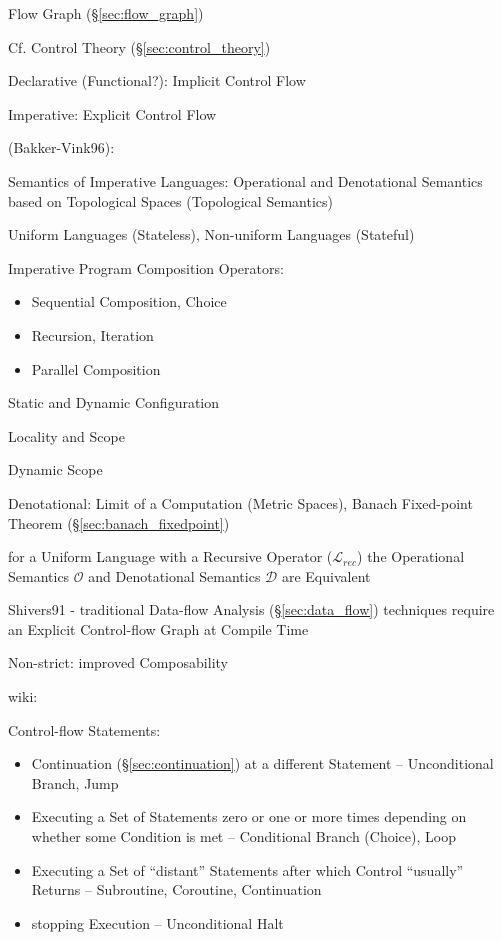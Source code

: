 \fist Flow Graph (\S\ref{sec:flow_graph})

\fist Cf. Control Theory (\S\ref{sec:control_theory})

Declarative (Functional?): Implicit Control Flow

Imperative: Explicit Control Flow

(Bakker-Vink96):

Semantics of Imperative Languages: Operational and Denotational
Semantics based on Topological Spaces (Topological Semantics)

Uniform Languages (Stateless), Non-uniform Languages (Stateful)

Imperative Program Composition Operators:
\begin{itemize}
  \item Sequential Composition, Choice
  \item Recursion, Iteration
  \item Parallel Composition
\end{itemize}

Static and Dynamic Configuration

Locality and Scope

Dynamic Scope

Denotational: Limit of a Computation (Metric Spaces), Banach
Fixed-point Theorem (\S\ref{sec:banach_fixedpoint}) %

for a Uniform Language with a Recursive Operator ($\mathcal{L}_{rec}$)
the Operational Semantics $\mathcal{O}$ and Denotational Semantics
$\mathcal{D}$ are Equivalent


\asterism


Shivers91 - traditional Data-flow Analysis (\S\ref{sec:data_flow})
techniques require an Explicit Control-flow Graph at Compile Time

Non-strict: improved Composability %


wiki:

Control-flow Statements:
\begin{itemize}
  \item Continuation (\S\ref{sec:continuation}) at a different
    Statement -- Unconditional Branch, Jump
  \item Executing a Set of Statements zero or one or more times
    depending on whether some Condition is met -- Conditional Branch
    (Choice), Loop
  \item Executing a Set of ``distant'' Statements after which Control
    ``usually'' Returns -- Subroutine, Coroutine, Continuation
  \item stopping Execution -- Unconditional Halt
\end{itemize}

